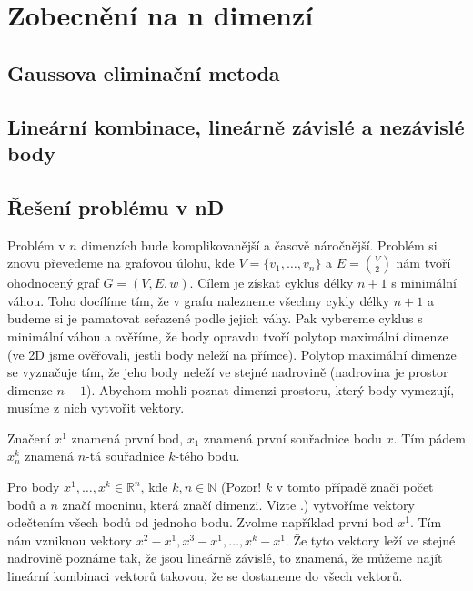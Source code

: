 \chapter{Zobecnění na n dimenzí}
\label{chap:n_dimenzi}
\section{Gaussova eliminační metoda}

\section{Lineární kombinace, lineárně závislé a nezávislé body}

\section{Řešení problému v nD}
Problém v $n$ dimenzích bude komplikovanější a časově náročnější. Problém si znovu převedeme na grafovou úlohu, kde $V = \{v_1,\ldots, v_n\}$ a $E = \binom{V}{2}$ nám tvoří ohodnocený graf $G = (V, E, w)$. Cílem je získat cyklus délky $n+1$ s minimální váhou. Toho docílíme tím, že v grafu nalezneme všechny cykly délky $n+1$ a budeme si je pamatovat seřazené podle jejich váhy. Pak vybereme cyklus s minimální váhou a ověříme, že body opravdu tvoří polytop maximální dimenze (ve 2D jsme ověřovali, jestli body neleží na přímce). Polytop maximální dimenze se vyznačuje tím, že jeho body neleží ve stejné nadrovině (nadrovina je prostor dimenze $n-1$). Abychom mohli poznat dimenzi prostoru, který body vymezují, musíme z nich vytvořit vektory.
\begin{varovani}
  \label{varovani:varovani_index}
  Značení $x^1$ znamená první bod, $x_1$ znamená první souřadnice bodu $x$. Tím pádem $x^k_n$ znamená $n$-tá souřadnice $k$-tého bodu.
\end{varovani}

Pro body $x^1, \ldots, x^k \in \mathbb{R}^n$, kde  $k, n \in \mathbb{N}$ (Pozor! $k$ v tomto případě značí počet bodů a $n$ značí mocninu, která značí dimenzi. Vizte .) vytvoříme vektory odečtením všech bodů od jednoho bodu. Zvolme například první bod $x^1$. Tím nám vzniknou vektory $x^2-x^1, x^3-x^1, \dots, x^k-x^1$. Že tyto vektory leží ve stejné nadrovině poznáme tak, že jsou lineárně závislé, to znamená, že můžeme najít lineární kombinaci vektorů takovou, že se dostaneme do všech vektorů.

